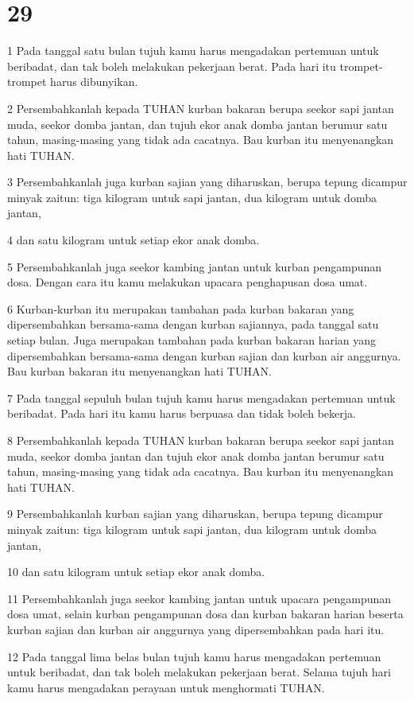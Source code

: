 \chapter{29}

\par 1 Pada tanggal satu bulan tujuh kamu harus mengadakan pertemuan untuk beribadat, dan tak boleh melakukan pekerjaan berat. Pada hari itu trompet-trompet harus dibunyikan.
\par 2 Persembahkanlah kepada TUHAN kurban bakaran berupa seekor sapi jantan muda, seekor domba jantan, dan tujuh ekor anak domba jantan berumur satu tahun, masing-masing yang tidak ada cacatnya. Bau kurban itu menyenangkan hati TUHAN.
\par 3 Persembahkanlah juga kurban sajian yang diharuskan, berupa tepung dicampur minyak zaitun: tiga kilogram untuk sapi jantan, dua kilogram untuk domba jantan,
\par 4 dan satu kilogram untuk setiap ekor anak domba.
\par 5 Persembahkanlah juga seekor kambing jantan untuk kurban pengampunan dosa. Dengan cara itu kamu melakukan upacara penghapusan dosa umat.
\par 6 Kurban-kurban itu merupakan tambahan pada kurban bakaran yang dipersembahkan bersama-sama dengan kurban sajiannya, pada tanggal satu setiap bulan. Juga merupakan tambahan pada kurban bakaran harian yang dipersembahkan bersama-sama dengan kurban sajian dan kurban air anggurnya. Bau kurban bakaran itu menyenangkan hati TUHAN.
\par 7 Pada tanggal sepuluh bulan tujuh kamu harus mengadakan pertemuan untuk beribadat. Pada hari itu kamu harus berpuasa dan tidak boleh bekerja.
\par 8 Persembahkanlah kepada TUHAN kurban bakaran berupa seekor sapi jantan muda, seekor domba jantan dan tujuh ekor anak domba jantan berumur satu tahun, masing-masing yang tidak ada cacatnya. Bau kurban itu menyenangkan hati TUHAN.
\par 9 Persembahkanlah kurban sajian yang diharuskan, berupa tepung dicampur minyak zaitun: tiga kilogram untuk sapi jantan, dua kilogram untuk domba jantan,
\par 10 dan satu kilogram untuk setiap ekor anak domba.
\par 11 Persembahkanlah juga seekor kambing jantan untuk upacara pengampunan dosa umat, selain kurban pengampunan dosa dan kurban bakaran harian beserta kurban sajian dan kurban air anggurnya yang dipersembahkan pada hari itu.
\par 12 Pada tanggal lima belas bulan tujuh kamu harus mengadakan pertemuan untuk beribadat, dan tak boleh melakukan pekerjaan berat. Selama tujuh hari kamu harus mengadakan perayaan untuk menghormati TUHAN.
